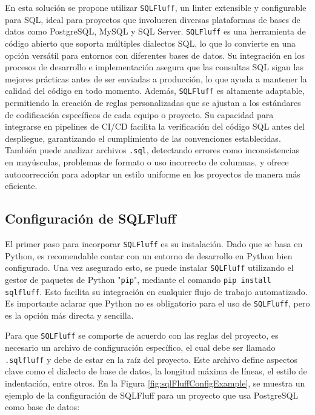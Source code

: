 \documentclass{IEEEtran}
\begin{document}
En esta solución se propone utilizar \texttt{SQLFluff}, un linter extensible y configurable para SQL, ideal para proyectos que involucren diversas plataformas de bases de datos como PostgreSQL, MySQL y SQL Server. \texttt{SQLFluff} es una herramienta de código abierto que soporta múltiples dialectos SQL, lo que lo convierte en una opción versátil para entornos con diferentes bases de datos. Su integración en los procesos de desarrollo e implementación asegura que las consultas SQL sigan las mejores prácticas antes de ser enviadas a producción, lo que ayuda a mantener la calidad del código en todo momento. Además, \texttt{SQLFluff} es altamente adaptable, permitiendo la creación de reglas personalizadas que se ajustan a los estándares de codificación específicos de cada equipo o proyecto. Su capacidad para integrarse en pipelines de CI/CD facilita la verificación del código SQL antes del despliegue, garantizando el cumplimiento de las convenciones establecidas. También puede analizar archivos \texttt{.sql}, detectando errores como inconsistencias en mayúsculas, problemas de formato o uso incorrecto de columnas, y ofrece autocorrección para adoptar un estilo uniforme en los proyectos de manera más eficiente.

\subsection{Configuración de SQLFluff}
El primer paso para incorporar \texttt{SQLFluff} es su instalación. Dado que se basa en Python, es recomendable contar con un entorno de desarrollo en Python bien configurado. Una vez asegurado esto, se puede instalar \texttt{SQLFluff} utilizando el gestor de paquetes de Python "\texttt{pip}", mediante el comando \texttt{pip install sqlfluff}. Esto facilita su integración en cualquier flujo de trabajo automatizado. Es importante aclarar que Python no es obligatorio para el uso de \texttt{SQLFluff}, pero es la opción más directa y sencilla.

Para que \texttt{SQLFluff} se comporte de acuerdo con las reglas del proyecto, es necesario un archivo de configuración específico, el cual debe ser llamado \texttt{.sqlfluff} y debe de estar en la raíz del proyecto. Este archivo define aspectos clave como el dialecto de base de datos, la longitud máxima de líneas, el estilo de indentación, entre otros. En la Figura \ref{fig:sqlFluffConfigExample}, se muestra un ejemplo de la configuración de SQLFluff para un proyecto que usa PostgreSQL como base de datos:
\end{document}
